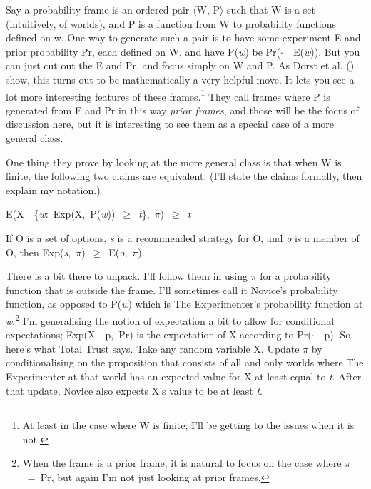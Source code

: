 \documentclass[
  12pt,
  letterpaper,
  DIV=11,
  numbers=noendperiod]{scrartcl}
\providecommand{\tightlist}{%
  \setlength{\itemsep}{0pt}\setlength{\parskip}{0pt}}\usepackage{longtable,booktabs,array}
\begin{document}
Say a probability frame is an ordered pair $\langle$W, P$\rangle$ such that W is a set
(intuitively, of worlds), and P is a function from W to probability
functions defined on w. One way to generate such a pair is to have some
experiment E and prior probability Pr, each defined on W, and have
P(\emph{w}) be Pr($\cdot$~\textbar~E(\emph{w})). But you can just cut out the
E and Pr, and focus simply on W and P. As Dorst et al.
() show, this turns out to be
mathematically a very helpful move. It lets you see a lot more
interesting features of these frames.\footnote{At least in the case
  where W is finite; I'll be getting to the issues when it is not.} They
call frames where P is generated from E and Pr in this way \emph{prior
frames}, and those will be the focus of discussion here, but it is
interesting to see them as a special case of a more general class.

One thing they prove by looking at the more general class is that when W
is finite, the following two claims are equivalent. (I'll state the
claims formally, then explain my notation.)

\begin{description}
\tightlist
\item[Total Trust]
E(X~\textbar~\{\emph{w}:~Exp(X,~P(\emph{w}))~$\geq$~\emph{t}\},~$\pi$)~$\geq$~\emph{t}
\item[Value]
If O is a set of options, \emph{s} is a recommended strategy for O, and
\emph{o} is a member of O, then Exp(\emph{s},~$\pi$)~$\geq$~E(\emph{o},~$\pi$).
\end{description}

There is a bit there to unpack. I'll follow them in using $\pi$ for a
probability function that is outside the frame. I'll sometimes call it
Novice's probability function, as opposed to P(\emph{w}) which is The
Experimenter's probability function at \emph{w}.\footnote{When the frame
  is a prior frame, it is natural to focus on the case where $\pi$~=~Pr, but
  again I'm not just looking at prior frames.} I'm generalising the
notion of expectation a bit to allow for conditional expectations;
Exp(X~\textbar~p,~Pr) is the expectation of X according to
Pr($\cdot$~\textbar~p). So here's what Total Trust says. Take any random
variable X. Update $\pi$ by conditionalising on the proposition that
consists of all and only worlds where The Experimenter at that world has
an expected value for X at least equal to \emph{t}. After that update,
Novice also expects X's value to be at least \emph{t}.
\end{document}
